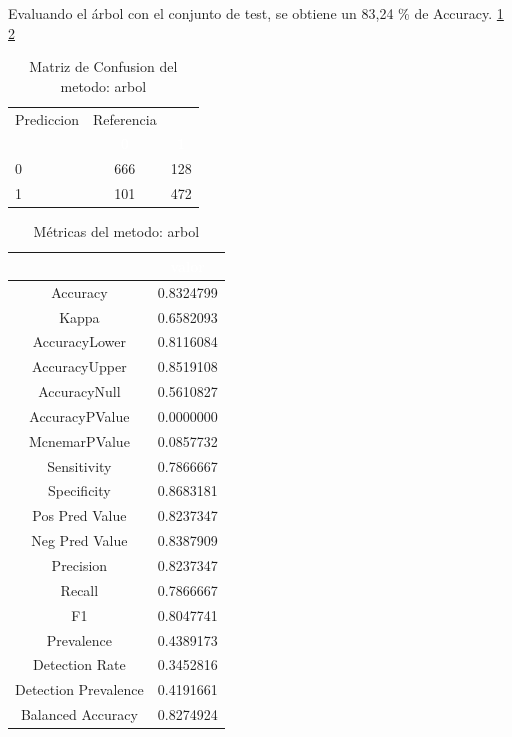 Evaluando el árbol con el conjunto de test, se obtiene un 83,24 \% de Accuracy. \ref{tab:MatrizConf_arbol} \ref{tab:metricas_arbol}

\begin{table}[!h]
	
	\caption{\label{tab:MatrizConf_arbol}Matriz de Confusion del metodo: arbol }
	\centering
	\begin{tabular}[t]{lcc}
		\toprule
		\multicolumn{1}{c}{Prediccion} & \multicolumn{1}{c}{Referencia} & \multicolumn{1}{c}{ } \\
		\cmidrule(l{3pt}r{3pt}){1-1} \cmidrule(l{3pt}r{3pt}){2-2}
		\rowcolor{black}  \multicolumn{1}{c}{\textcolor{white}{\textbf{ }}} & \multicolumn{1}{c}{\textcolor{white}{\textbf{0}}} & \multicolumn{1}{c}{\textcolor{white}{\textbf{1}}}\\
		\midrule
		\rowcolor{gray!6}  0 & 666 & 128\\
		1 & 101 & 472\\
		\bottomrule
	\end{tabular}
\end{table}

\begin{table}[!h]
	
	\caption{\label{tab:metricas_arbol}Métricas del metodo: arbol }
	\centering
	\begin{tabular}[t]{cc}
		\toprule
		\rowcolor{black}  \multicolumn{1}{c}{\textcolor{white}{\textbf{metricas}}} & \multicolumn{1}{c}{\textcolor{white}{\textbf{valor}}}\\
		\midrule
		\rowcolor{gray!6}  Accuracy & 0.8324799\\
		Kappa & 0.6582093\\
		\rowcolor{gray!6}  AccuracyLower & 0.8116084\\
		AccuracyUpper & 0.8519108\\
		\rowcolor{gray!6}  AccuracyNull & 0.5610827\\
		\addlinespace
		AccuracyPValue & 0.0000000\\
		\rowcolor{gray!6}  McnemarPValue & 0.0857732\\
		Sensitivity & 0.7866667\\
		\rowcolor{gray!6}  Specificity & 0.8683181\\
		Pos Pred Value & 0.8237347\\
		\addlinespace
		\rowcolor{gray!6}  Neg Pred Value & 0.8387909\\
		Precision & 0.8237347\\
		\rowcolor{gray!6}  Recall & 0.7866667\\
		F1 & 0.8047741\\
		\rowcolor{gray!6}  Prevalence & 0.4389173\\
		\addlinespace
		Detection Rate & 0.3452816\\
		\rowcolor{gray!6}  Detection Prevalence & 0.4191661\\
		Balanced Accuracy & 0.8274924\\
		\bottomrule
	\end{tabular}
\end{table}


